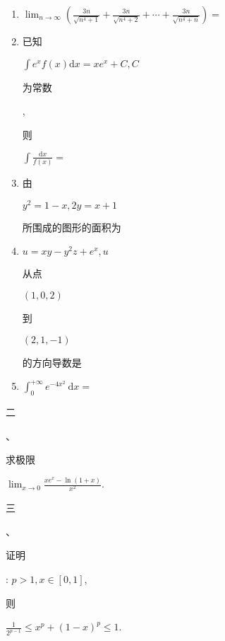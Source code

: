 \documentclass[10pt]{article}
\begin{document}
\begin{enumerate}
  \item $\lim _{n \rightarrow \infty}\left(\frac{3 n}{\sqrt{n^{4}+1}}+\frac{3 n}{\sqrt{n^{4}+2}}+\cdots+\frac{3 n}{\sqrt{n^{4}+n}}\right)=$

  \item \begin{CJK}{UTF8}{mj}已知\end{CJK} $\int e^{x} f(x) \mathrm{d} x=x e^{x}+C, C$ \begin{CJK}{UTF8}{mj}为常数\end{CJK}, \begin{CJK}{UTF8}{mj}则\end{CJK} $\int \frac{\mathrm{d} x}{f(x)}=$

  \item \begin{CJK}{UTF8}{mj}由\end{CJK} $y^{2}=1-x, 2 y=x+1$ \begin{CJK}{UTF8}{mj}所围成的图形的面积为\end{CJK}

  \item $u=x y-y^{2} z+e^{x}, u$ \begin{CJK}{UTF8}{mj}从点\end{CJK} $(1,0,2)$ \begin{CJK}{UTF8}{mj}到\end{CJK} $(2,1,-1)$ \begin{CJK}{UTF8}{mj}的方向导数是\end{CJK}

  \item $\int_{0}^{+\infty} e^{-4 x^{2}} \mathrm{~d} x=$

\end{enumerate}
\begin{CJK}{UTF8}{mj}二\end{CJK}、\begin{CJK}{UTF8}{mj}求极限\end{CJK} $\lim _{x \rightarrow 0} \frac{x e^{x}-\ln (1+x)}{x^{2}}$.

\begin{CJK}{UTF8}{mj}三\end{CJK}、\begin{CJK}{UTF8}{mj}证明\end{CJK}: $p>1, x \in[0,1]$, \begin{CJK}{UTF8}{mj}则\end{CJK} $\frac{1}{2^{p-1}} \leqslant x^{p}+(1-x)^{p} \leqslant 1$.
\end{document}
